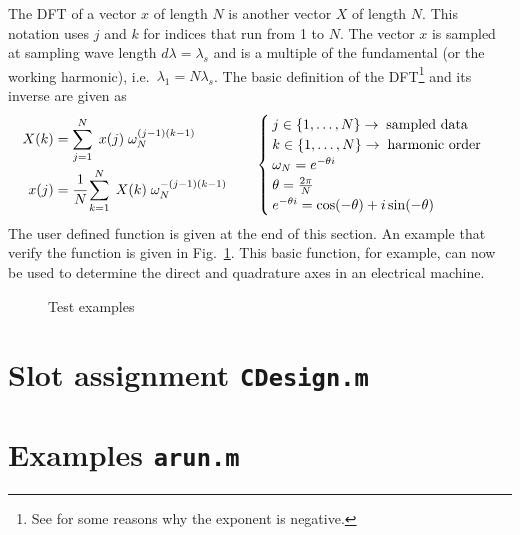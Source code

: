 \begin{appendices}
The DFT of a vector $x$ of length $N$ is another vector $X$ of length $N$. This notation uses $j$ and $k$ for indices that run from 1 to $N$. The vector $x$ is sampled at sampling wave length $d\lambda=\lambda_s$ and is a multiple of the fundamental (or the working harmonic), i.e.~$\lambda_1 = N\lambda_s$. The basic definition of the DFT\footnote{See \cite{REF-01048, REF-01049, REF-01050} for some reasons why the exponent is negative.} and its inverse are given as
\begin{equation}\label{eqn:dft}
  \begin{aligned}
  X(k) &= \sum_{j=1}^N \; x(j) \; \omega_N^{(j-1)(k-1)}\\
  x(j) &= \cfrac{1}{N}\sum_{k=1}^N \; X(k) \; \omega_N^{-(j-1)(k-1)}
  \end{aligned}
  \qquad
  \begin{cases}
    j \in \left\{1,\ldots,N  \right\} \rightarrow \; \mbox{sampled data}\\
  	k \in \left\{1,\ldots,N  \right\} \rightarrow \; \mbox{harmonic order}\\
    \omega_N = e^{-\theta i}  \\
  	\theta = \frac{2\pi}{N}   \\
  	e^{-\theta i} = \cos (-\theta) + i \sin (-\theta)
  \end{cases}
\end{equation}
The user defined function is given at the end of this section. An example that verify the function is given in Fig.~\ref{fig:user}. This basic function, for example, can now be used to determine the direct and quadrature axes in an electrical machine. 

\begin{figure}[htbp]
  \centering  
  \fontsize{6}{0}\selectfont
  \setlength{}
  \subfloat[$\phi = \SI{-60}{\arcdeg}$]{
  }
  \hfill
  \subfloat[$\phi = \SI{33}{\arcdeg}$]{
  }
  \caption{Test examples}
  \label{fig:user}
\end{figure}



\chapter{Slot assignment \texttt{CDesign.m}}\label{sec:malg}


\chapter{Examples \texttt{arun.m}}\label{sec:mex}



\end{appendices}
